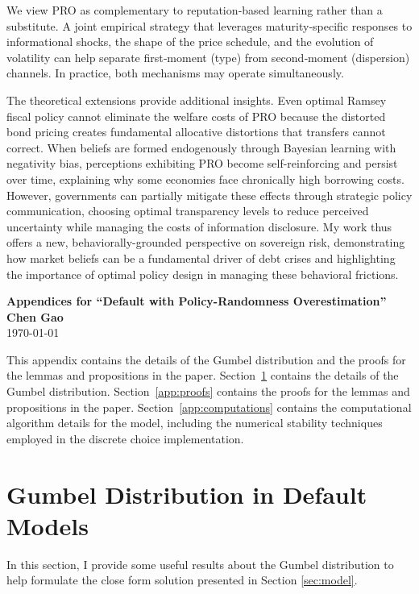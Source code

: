 \documentclass[12pt]{article}
\theoremstyle{plain}
\begin{document}
We view PRO as complementary to reputation‑based learning rather than a
substitute. A joint empirical strategy that leverages maturity‑specific
responses to informational shocks, the shape of the price schedule, and the
evolution of volatility can help separate first‑moment (type) from
second‑moment (dispersion) channels. In practice, both mechanisms may operate
simultaneously.

The theoretical extensions provide additional insights. Even optimal Ramsey
fiscal policy cannot eliminate the welfare costs of PRO because the distorted
bond pricing creates fundamental allocative distortions that transfers cannot
correct. When beliefs are formed endogenously through Bayesian learning with
negativity bias, perceptions exhibiting PRO become self-reinforcing and persist
over time, explaining why some economies face chronically high borrowing costs.
However, governments can partially mitigate these effects through strategic
policy communication, choosing optimal transparency levels to reduce perceived
uncertainty while managing the costs of information disclosure. My work thus
offers a new, behaviorally-grounded perspective on sovereign risk,
demonstrating how market beliefs can be a fundamental driver of debt crises and
highlighting the importance of optimal policy design in managing these
behavioral frictions.

\clearpage
\appendix

\setcounter{equation}{0}
\renewcommand{\theequation}{\thesection.\arabic{equation}}

\begin{center}
	\Large \textbf{Appendices for ``Default with Policy-Randomness Overestimation''}\\
	\vspace{0.5cm}
	\large \textbf{Chen Gao}
	\\
	\large \today
\end{center}

This appendix contains the details of the Gumbel distribution and the proofs
for the lemmas and propositions in the paper. Section~\ref{app:gumbel} contains
the details of the Gumbel distribution. Section~\ref{app:proofs} contains the
proofs for the lemmas and propositions in the paper.
Section~\ref{app:computations} contains the computational algorithm details for
the model, including the numerical stability techniques employed in the
discrete choice implementation.

\section{Gumbel Distribution in Default Models}\label{app:gumbel}
In this section, I provide some useful results about the Gumbel distribution to
help formulate the close form solution presented in Section \ref{sec:model}.
\end{document}
